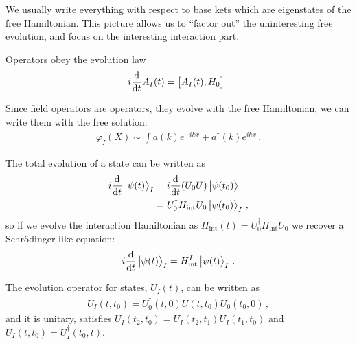 \documentclass[main.tex]{subfiles}
\begin{document}
We usually write everything with respect to base kets which are eigenstates of the free Hamiltonian. 
This picture allows us to ``factor out'' the uninteresting free evolution, and focus on the interesting interaction part. 

Operators obey the evolution law 
%
\begin{align}
i \dv{}{t} A_I (t) = \qty[A_I(t), H_0 ]
\,.
\end{align}

Since field operators are operators, they evolve with the free Hamiltonian, we can write them with the free solution: 
%
\begin{align}
\varphi_{I} (X) \sim \int a(k) e^{-ikx} + a ^\dag(k) e^{ikx}
\,.
\end{align}

The total evolution of a state can be written as 
%
\begin{subequations}
\begin{align}
i \dv{}{t} \ket{\psi (t)}_{I} &= i \dv{}{t} \qty(U_0 U) \ket{\psi (t_0 )} \\
&= U_0 ^\dag H _{\text{int}} U_0 \ket{\psi (t_0 )}_{I}
\,,
\end{align}
\end{subequations}
%
so if we evolve the interaction Hamiltonian as \(H _{\text{int}} (t) = U_0 ^\dag H _{\text{int}} U_0 \) we recover a Schrödinger-like equation: 
%
\begin{align}
i \dv{}{t} \ket{\psi (t)}_{I} = H _{\text{int}}^{I} \ket{\psi (t)}_{I}
\,.
\end{align}

\begin{claim}
The evolution operator for states, \(U_I (t)\), can be written as 
%
\begin{align}
U_I (t, t_0 ) = U_0^\dag(t,0)  U (t, t_0 ) U_0 (t_0, 0) 
\,,
\end{align}
%
and it is unitary, satisfies \(U_{I}(t_2, t_0 ) = U_I (t_2 , t_1 ) U_I (t_1 , t_0 )\) and \(U_I (t, t_0 ) = U ^\dag_I (t_0, t)\).  
\end{claim}

\end{document}
